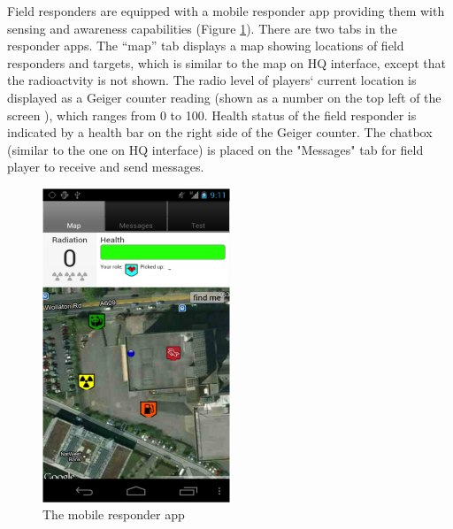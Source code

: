 Field responders are equipped with a mobile responder app providing them with sensing and awareness capabilities (Figure \ref{fig:mobileResponderApp}). There are two tabs in the responder apps. The ``map'' tab displays a map showing locations of field responders and targets, which is similar to the map on HQ interface, except that the radioactvity is not shown. The radio level of players` current location is displayed as a Geiger counter reading (shown as a number on the top left of the screen ), which ranges from 0 to 100. Health status of the field responder is indicated by a health bar on the right side of the Geiger counter. The chatbox (similar to the one on HQ interface) is placed on the "Messages" tab for field player to receive and send messages.\\

\begin{figure}[h]
  \centering
  \includegraphics[width=0.5\textwidth]{img/study1/mobileinterface}
  \caption{The mobile responder app}
  \label{fig:mobileResponderApp}
\end{figure}



